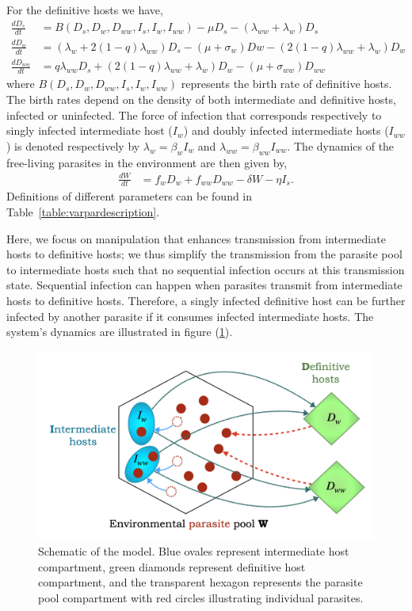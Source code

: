 \documentclass[11pt]{article}
\begin{document}
For the definitive hosts we have,
%
\begin{align}
\frac{dD_s}{dt} &= B(D_s,  D_w,  D_{ww},  I_s, I_w, I_{ww})  - \mu D_s - (\lambda_{ww} + \lambda_w) D_s \nonumber \\    
\frac{dD_w}{dt} &= (\lambda_w + 2 (1 - q) \lambda_{ww}) D_s - (\mu + \sigma_w) Dw - (2 (1 - q) \lambda_{ww} + \lambda_w) D_w  \label{odes:dhosts} \\         
\frac{dD_{ww}}{dt} &= q \lambda_{ww} D_s + (2 (1 - q) \lambda_{ww} + \lambda_w) D_w - (\mu + \sigma_{ww}) D_{ww} \nonumber
\end{align}
%
where $B(D_s, D_w, D_{ww}, I_s, I_w, I_{ww})$ represents the birth rate of definitive hosts.
The birth rates depend on the density of both intermediate and definitive hosts, infected or uninfected. 
The force of infection that corresponds respectively to singly infected intermediate host ($I_w$) and doubly infected intermediate hosts ($I_{ww}$) is denoted respectively by $\lambda_w = \beta_w I_w$ and $\lambda_{ww} = \beta_{ww} I_{ww}$. 
The dynamics of the free-living parasites in the environment are then given by,
\begin{align}
	\frac{dW}{dt} &= f_w D_w + f_{ww} D_{ww} - \delta W - \eta I_s. \label{odes:eparasite}
\end{align}
%
Definitions of different parameters can be found in Table~\ref{table:varpardescription}.

Here, we focus on manipulation that enhances transmission from intermediate hosts to definitive hosts; we thus simplify the transmission from the parasite pool to intermediate hosts such that no sequential infection occurs at this transmission state. 
Sequential infection can happen when parasites transmit from intermediate hosts to definitive hosts. 
Therefore, a singly infected definitive host can be further infected by another parasite if it consumes infected intermediate hosts. 
The system's dynamics are illustrated in figure (\ref{fig:schematic}).
%
\begin{figure}[ht!]
\centering
\includegraphics[width=\textwidth]{Figures/schematic.jpeg}
\caption{Schematic of the model. Blue ovales represent intermediate host compartment, 
green diamonds represent definitive host compartment, 
and the transparent hexagon represents the parasite pool compartment with red circles illustrating individual parasites.
}
\label{fig:schematic}
\end{figure}
\end{document}
